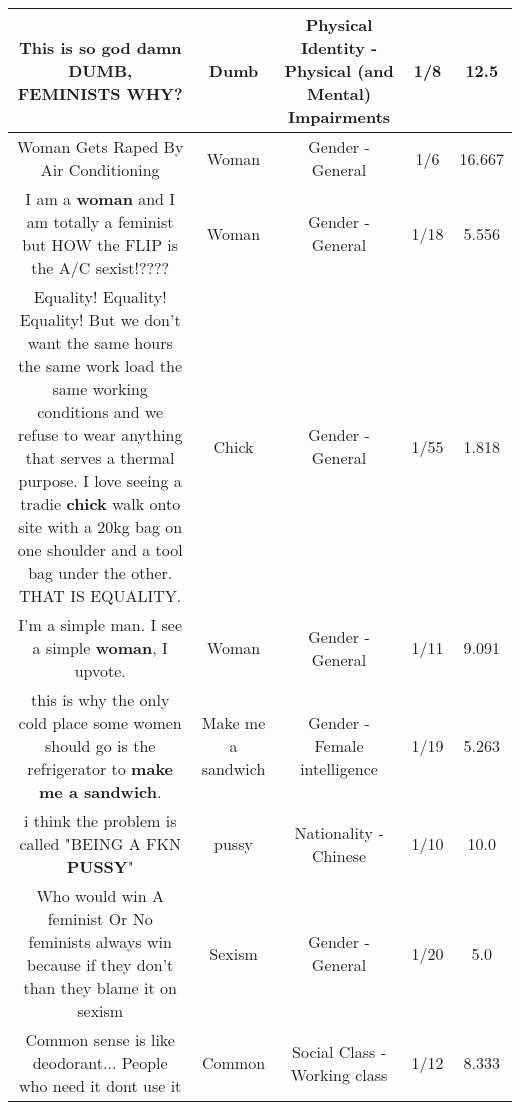 \documentclass[11pt]{article}
\newlength\mylength
\begin{document}
\begin{center}
\begin{longtable}{|C{.65\mylength}|C{.30\mylength}|C{.12\mylength}|C{.12\mylength}|C{.12\mylength}|}
  \small This is so god damn \textbf{DUMB}, FEMINISTS WHY?\normalsize   & Dumb & Physical Identity - Physical (and Mental) Impairments & 1/8 & 12.5 \\  \hline
  \small Woman Gets Raped By Air Conditioning\normalsize   & Woman & Gender - General & 1/6 & 16.667 \\  \hline
  \small I am a \textbf{woman} and I am totally a feminist but HOW the FLIP is the A/C sexist!????\normalsize   & Woman & Gender - General & 1/18 & 5.556 \\  \hline
  \small Equality! Equality! Equality! But we don't want the same hours the same work load the same working conditions and we refuse to wear anything that serves a thermal purpose. I love seeing a tradie \textbf{chick} walk onto site with a 20kg bag on one shoulder and a tool bag under the other. THAT IS EQUALITY.\normalsize   & Chick & Gender - General & 1/55 & 1.818 \\  \hline
  \small I'm a simple man. I see a simple \textbf{woman}, I upvote.\normalsize   & Woman & Gender - General & 1/11 & 9.091 \\  \hline
  \small this is why the only cold place some women should go is the refrigerator to \textbf{make me a sandwich}.\normalsize   & Make me a sandwich & Gender - Female intelligence & 1/19 & 5.263 \\  \hline
  \small i think the problem is called "BEING A FKN \textbf{PUSSY}"\normalsize   & pussy & Nationality - Chinese & 1/10 & 10.0 \\  \hline
  \small Who would win A feminist Or No feminists always win because if they don't than they blame it on sexism\normalsize   & Sexism & Gender - General & 1/20 & 5.0 \\  \hline
  \small Common sense is like deodorant... People who need it dont use it\normalsize   & Common & Social Class - Working class & 1/12 & 8.333 \\  \hline

\end{longtable}
\end{center}
\end{document}
